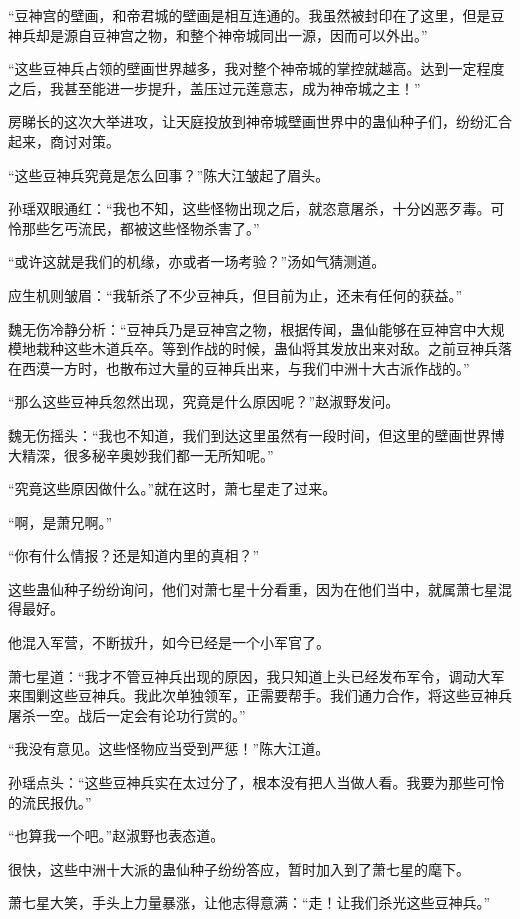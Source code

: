 \begin{this_body}
“豆神宫的壁画，和帝君城的壁画是相互连通的。我虽然被封印在了这里，但是豆神兵却是源自豆神宫之物，和整个神帝城同出一源，因而可以外出。”

“这些豆神兵占领的壁画世界越多，我对整个神帝城的掌控就越高。达到一定程度之后，我甚至能进一步提升，盖压过元莲意志，成为神帝城之主！”

房睇长的这次大举进攻，让天庭投放到神帝城壁画世界中的蛊仙种子们，纷纷汇合起来，商讨对策。

“这些豆神兵究竟是怎么回事？”陈大江皱起了眉头。

孙瑶双眼通红：“我也不知，这些怪物出现之后，就恣意屠杀，十分凶恶歹毒。可怜那些乞丐流民，都被这些怪物杀害了。”

“或许这就是我们的机缘，亦或者一场考验？”汤如气猜测道。

应生机则皱眉：“我斩杀了不少豆神兵，但目前为止，还未有任何的获益。”

魏无伤冷静分析：“豆神兵乃是豆神宫之物，根据传闻，蛊仙能够在豆神宫中大规模地栽种这些木道兵卒。等到作战的时候，蛊仙将其发放出来对敌。之前豆神兵落在西漠一方时，也散布过大量的豆神兵出来，与我们中洲十大古派作战的。”

“那么这些豆神兵忽然出现，究竟是什么原因呢？”赵淑野发问。

魏无伤摇头：“我也不知道，我们到达这里虽然有一段时间，但这里的壁画世界博大精深，很多秘辛奥妙我们都一无所知呢。”

“究竟这些原因做什么。”就在这时，萧七星走了过来。

“啊，是萧兄啊。”

“你有什么情报？还是知道内里的真相？”

这些蛊仙种子纷纷询问，他们对萧七星十分看重，因为在他们当中，就属萧七星混得最好。

他混入军营，不断拔升，如今已经是一个小军官了。

萧七星道：“我才不管豆神兵出现的原因，我只知道上头已经发布军令，调动大军来围剿这些豆神兵。我此次单独领军，正需要帮手。我们通力合作，将这些豆神兵屠杀一空。战后一定会有论功行赏的。”

“我没有意见。这些怪物应当受到严惩！”陈大江道。

孙瑶点头：“这些豆神兵实在太过分了，根本没有把人当做人看。我要为那些可怜的流民报仇。”

“也算我一个吧。”赵淑野也表态道。

很快，这些中洲十大派的蛊仙种子纷纷答应，暂时加入到了萧七星的麾下。

萧七星大笑，手头上力量暴涨，让他志得意满：“走！让我们杀光这些豆神兵。”

\end{this_body}

